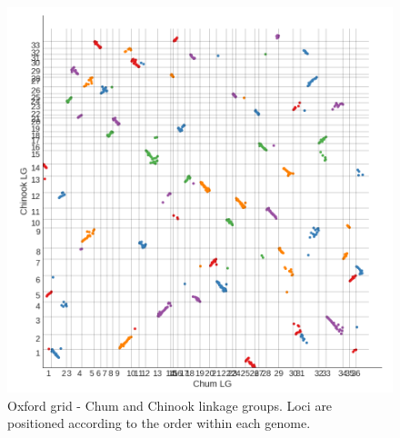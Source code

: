 \documentclass[12pt,  one column]{article}
\begin{document}
\begin{figure}[H]
\includegraphics[scale=.25]{figures/supplemental/synteny_chinook.png}
\caption{Oxford grid - Chum and Chinook linkage groups.  Loci are positioned according to the order within each genome.}
\end{figure}

\end{document}
